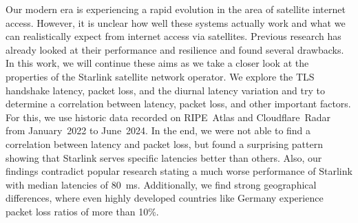 Our modern era is experiencing a rapid evolution in the area of satellite
internet access. However, it is unclear how well these systems actually work
and what we can realistically expect from internet access via satellites.
Previous research has already looked at their performance and resilience and
found several drawbacks. In this work, we will continue these aims as we take a
closer look at the properties of the Starlink satellite network operator. We
explore the TLS handshake latency, packet loss, and the diurnal latency
variation and try to determine a correlation between latency, packet loss, and
other important factors. For this, we use historic data recorded on RIPE~Atlas
and Cloudflare~Radar from January~2022 to June~2024. In the end, we were not
able to find a correlation between latency and packet loss, but found a
surprising pattern showing that Starlink serves specific latencies better than
others. Also, our findings contradict popular research stating a much worse
performance of Starlink with median latencies of 80~ms. Additionally, we find
strong geographical differences, where even highly developed countries like
Germany experience packet loss ratios of more than 10\%.
